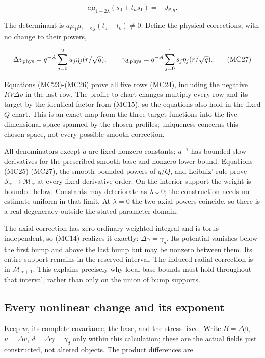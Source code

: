 \documentclass[10pt,a4paper]{article}
\begin{document}
\[
a\mu_{1-2\lambda}(s_0+t_as_1)=-J_{\theta,q}.
\]

The determinant is \(a\mu_1\mu_{1-2\lambda}(t_a-t_b)\ne0\). Define the physical corrections, with no change to their powers,

\[
\Delta v_{\rm phys}=q^{-A}\sum_{j=0}^2u_j\eta_j(r/\sqrt q),
\qquad
\gamma_{d,\rm phys}=q^{-A}\sum_{j=0}^1s_j\eta_j(r/\sqrt q).
\tag{MC27}
\]

Equations (MC23)-(MC26) prove all five rows (MC24), including the negative \(RV\Delta v\) in the last row. The profile-to-chart changes multiply every row and its target by the identical factor from (MC15), so the equations also hold in the fixed \(Q\) chart. This is an exact map from the three target functions into the five-dimensional space spanned by the chosen profiles; uniqueness concerns this chosen space, not every possible smooth correction.

All denominators except \(a\) are fixed nonzero constants; \(a^{-1}\) has bounded slow derivatives for the prescribed smooth base and nonzero lower bound. Equations (MC25)-(MC27), the smooth bounded powers of \(q/Q\), and Leibniz' rule prove \(\mathcal S_\alpha\to\mathcal M_\alpha\) at every fixed derivative order. On the interior support the weight is bounded below. Constants may deteriorate as \(\lambda\downarrow0\); the construction needs no estimate uniform in that limit. At \(\lambda=0\) the two axial powers coincide, so there is a real degeneracy outside the stated parameter domain.

The axial correction has zero ordinary weighted integral and is torus independent, so (MC14) realizes it exactly: \(\Delta\gamma=\gamma_d\). Its potential vanishes below the first bump and above the last bump but may be nonzero between them. Its entire support remains in the reserved interval. The induced radial correction is in \(\mathcal M_{\alpha+1}\). This explains precisely why local base bounds must hold throughout that interval, rather than only on the union of bump supports.

\subsection{Every nonlinear change and its exponent}

Keep \(w\), its complete covariance, the base, and the stress fixed. Write \(B=\Delta\beta\), \(u=\Delta v\), \(d=\Delta\gamma=\gamma_d\) only within this calculation; these are the actual fields just constructed, not altered objects. The product differences are
\end{document}
